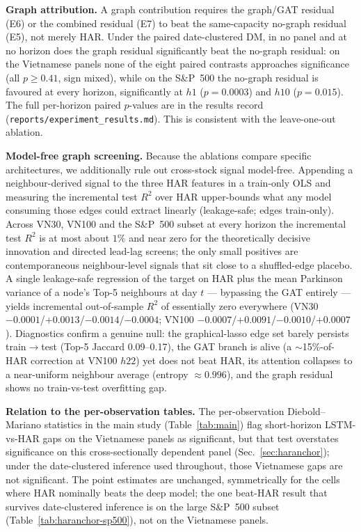 \documentclass[runningheads]{llncs}
\begin{document}
\textbf{Graph attribution.} A graph contribution requires the graph/GAT residual (E6) or the combined
residual (E7) to beat the same-capacity no-graph residual (E5), not merely HAR. Under the paired date-clustered
DM, in no panel and at no horizon does the graph residual significantly beat the no-graph residual: on the
Vietnamese panels none of the eight paired contrasts approaches significance (all $p\ge0.41$, sign mixed),
while on the S\&P~500 the no-graph residual is favoured at every horizon, significantly at $h1$ ($p=0.0003$) and
$h10$ ($p=0.015$). The full per-horizon paired $p$-values are in the results record
(\texttt{reports/experiment\_results.md}). This is consistent with the leave-one-out ablation.

\textbf{Model-free graph screening.} Because the ablations compare specific architectures, we additionally
rule out cross-stock signal model-free. Appending a neighbour-derived signal to the three HAR features in a
train-only OLS and measuring the incremental test $R^2$ over HAR upper-bounds what any model consuming those
edges could extract linearly (leakage-safe; edges train-only). Across VN30, VN100 and the S\&P~500 subset at
every horizon the incremental test $R^2$ is at most about $1\%$ and near zero for the theoretically decisive
innovation and directed lead-lag screens; the only small positives are contemporaneous neighbour-level
signals that sit close to a shuffled-edge placebo. A single leakage-safe regression of the target on HAR plus
the mean Parkinson variance of a node's Top-5 neighbours at day $t$ --- bypassing the GAT entirely --- yields
incremental out-of-sample $R^2$ of essentially zero everywhere (VN30 $-0.0001$/$+0.0013$/$-0.0014$/$-0.0004$;
VN100 $-0.0007$/$+0.0091$/$-0.0010$/$+0.0007$). Diagnostics confirm a genuine null: the graphical-lasso edge
set barely persists train$\to$test (Top-5 Jaccard 0.09--0.17), the GAT branch is alive (a $\sim$15\%-of-HAR
correction at VN100 $h22$) yet does not beat HAR, its attention collapses to a near-uniform neighbour average
(entropy $\approx0.996$), and the graph residual shows no train-vs-test overfitting gap.

\textbf{Relation to the per-observation tables.} The per-observation Diebold--Mariano statistics in the main
study (Table~\ref{tab:main}) flag short-horizon LSTM-vs-HAR gaps on the Vietnamese panels as significant, but
that test overstates significance on this cross-sectionally dependent panel (Sec.~\ref{sec:haranchor});
under the date-clustered inference used throughout, those Vietnamese gaps are not significant. The point
estimates are unchanged, symmetrically for the cells where HAR nominally beats the deep model; the one
beat-HAR result that survives date-clustered inference is on the large S\&P~500 subset
(Table~\ref{tab:haranchor-sp500}), not on the Vietnamese panels.
\end{document}
